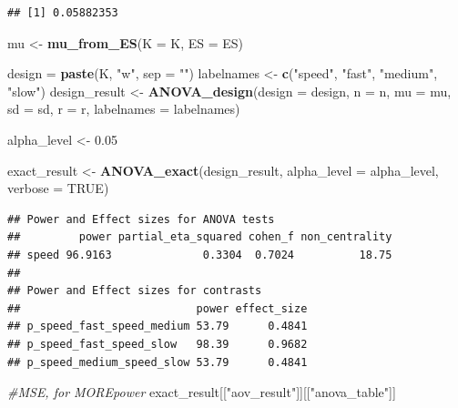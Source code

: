 \documentclass[]{book}
\newenvironment{Shaded}{\begin{snugshade}}{\end{snugshade}}
\newcommand{\CommentTok}[1]{\textcolor[rgb]{0.56,0.35,0.01}{\textit{#1}}}
\newcommand{\DataTypeTok}[1]{\textcolor[rgb]{0.13,0.29,0.53}{#1}}
\newcommand{\FloatTok}[1]{\textcolor[rgb]{0.00,0.00,0.81}{#1}}
\newcommand{\KeywordTok}[1]{\textcolor[rgb]{0.13,0.29,0.53}{\textbf{#1}}}
\newcommand{\NormalTok}[1]{#1}
\newcommand{\OtherTok}[1]{\textcolor[rgb]{0.56,0.35,0.01}{#1}}
\newcommand{\StringTok}[1]{\textcolor[rgb]{0.31,0.60,0.02}{#1}}
\begin{document}
\begin{verbatim}
## [1] 0.05882353
\end{verbatim}

\begin{Shaded}
\begin{Highlighting}[]
\NormalTok{mu <-}\StringTok{ }\KeywordTok{mu_from_ES}\NormalTok{(}\DataTypeTok{K =}\NormalTok{ K, }\DataTypeTok{ES =}\NormalTok{ ES)}

\NormalTok{design =}\StringTok{ }\KeywordTok{paste}\NormalTok{(K, }\StringTok{"w"}\NormalTok{, }\DataTypeTok{sep =} \StringTok{""}\NormalTok{)}
\NormalTok{labelnames <-}\StringTok{ }\KeywordTok{c}\NormalTok{(}\StringTok{"speed"}\NormalTok{, }\StringTok{"fast"}\NormalTok{, }\StringTok{"medium"}\NormalTok{, }\StringTok{"slow"}\NormalTok{)}
\NormalTok{design_result <-}\StringTok{ }\KeywordTok{ANOVA_design}\NormalTok{(}\DataTypeTok{design =}\NormalTok{ design,}
                   \DataTypeTok{n =}\NormalTok{ n, }
                   \DataTypeTok{mu =}\NormalTok{ mu, }
                   \DataTypeTok{sd =}\NormalTok{ sd, }
                   \DataTypeTok{r =}\NormalTok{ r, }
                   \DataTypeTok{labelnames =}\NormalTok{ labelnames)}

\NormalTok{alpha_level <-}\StringTok{ }\FloatTok{0.05}

\NormalTok{exact_result <-}\StringTok{ }\KeywordTok{ANOVA_exact}\NormalTok{(design_result,}
                            \DataTypeTok{alpha_level =}\NormalTok{ alpha_level,}
                            \DataTypeTok{verbose =} \OtherTok{TRUE}\NormalTok{)}
\end{Highlighting}
\end{Shaded}

\begin{verbatim}
## Power and Effect sizes for ANOVA tests
##         power partial_eta_squared cohen_f non_centrality
## speed 96.9163              0.3304  0.7024          18.75
## 
## Power and Effect sizes for contrasts
##                           power effect_size
## p_speed_fast_speed_medium 53.79      0.4841
## p_speed_fast_speed_slow   98.39      0.9682
## p_speed_medium_speed_slow 53.79      0.4841
\end{verbatim}

\begin{Shaded}
\begin{Highlighting}[]
\CommentTok{#MSE, for MOREpower}
\NormalTok{exact_result[[}\StringTok{"aov_result"}\NormalTok{]][[}\StringTok{"anova_table"}\NormalTok{]]}
\end{Highlighting}
\end{Shaded}
\end{document}
